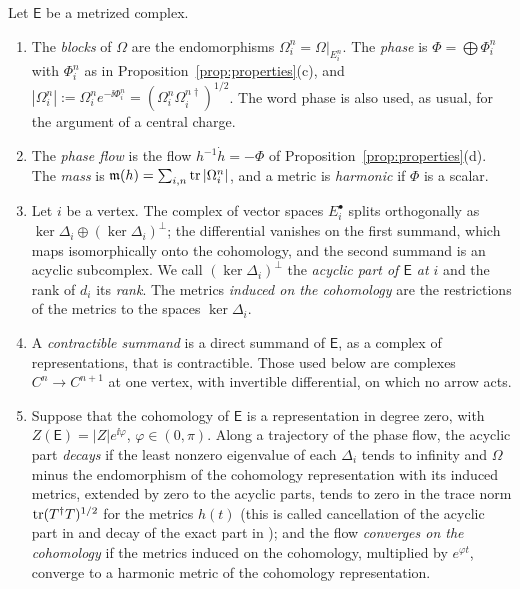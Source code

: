 \begin{definition}\label{def:phase}
Let $\mathsf E$ be a metrized complex.
\begin{enumerate}
\item[(i)] The \emph{blocks} of $\Omega$ are the endomorphisms
 $\Omega_i^n=\Omega|_{E_i^n}$. The \emph{phase} is
 $\Phi=\bigoplus\Phi_i^n$ with $\Phi_i^n$ as in
 Proposition~\ref{prop:properties}(c), and
 $|\Omega_i^n|:=\Omega_i^ne^{-\ii\Phi_i^n}=(\Omega_i^n\Omega_i^{n\dagger})^{1/2}$.
 The word phase is also used, as usual, for the argument of a central
 charge.
\item[(ii)] The \emph{phase flow} is the flow $h^{-1}\dot h=-\Phi$ of
 Proposition~\ref{prop:properties}(d). The \emph{mass} is
 $\mathfrak m(h)=\sum_{i,n}\operatorname{tr}|\Omega_i^n|$, and a metric is \emph{harmonic} if
 $\Phi$ is a scalar.
\item[(iii)] Let $i$ be a vertex. The complex of vector spaces $E_i^\bullet$
 splits orthogonally as $\ker\Delta_i\oplus(\ker\Delta_i)^\perp$; the
 differential vanishes on the first summand, which maps isomorphically onto
 the cohomology, and the second summand is an acyclic subcomplex. We call
 $(\ker\Delta_i)^\perp$ the \emph{acyclic part of $\mathsf E$ at $i$} and the
 rank of $d_i$ its \emph{rank}. The metrics \emph{induced on the cohomology}
 are the restrictions of the metrics to the spaces $\ker\Delta_i$.
\item[(iv)] A \emph{contractible summand} is a direct summand of
 $\mathsf E$, as a complex of representations, that is contractible. Those
 used below are complexes $C^n\to C^{n+1}$ at one vertex, with invertible
 differential, on which no arrow acts.
\item[(v)] Suppose that the cohomology of $\mathsf E$ is a representation in
 degree zero, with $Z(\mathsf E)=|Z|e^{\ii\varphi}$, $\varphi\in(0,\pi)$.
 Along a trajectory of the phase flow, the acyclic part \emph{decays} if the
 least nonzero eigenvalue of each $\Delta_i$ tends to infinity and $\Omega$
 minus the endomorphism of the cohomology representation with its induced
 metrics, extended by zero to the acyclic parts, tends to zero in the trace
 norm $\operatorname{tr}(T^\dagger T)^{1/2}$ for the metrics $h(t)$ (this is called
 cancellation of the acyclic part
 in \cite{wue26b} and decay of the exact part in \cite{wue26c}); and the
 flow
 \emph{converges on the cohomology} if the metrics induced on the
 cohomology, multiplied by $e^{\varphi t}$, converge to a harmonic metric of
 the cohomology representation.
\end{enumerate}
\end{definition}

